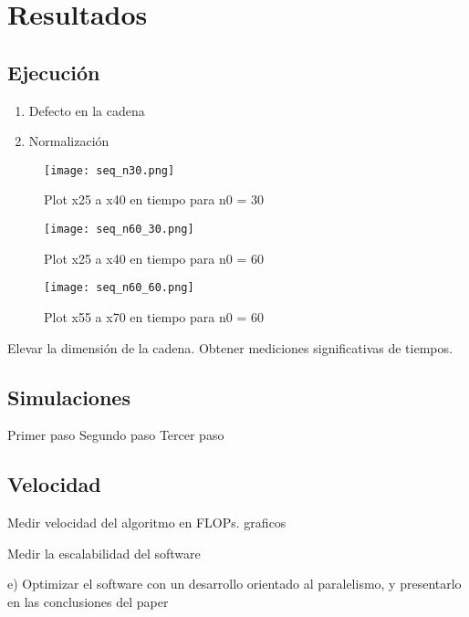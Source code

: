 \section{Resultados}

\subsection{Ejecución}

\begin{enumerate}
	\item Defecto en la cadena
	      	          
	\item Normalización
	      	          
\end{enumerate}

\begin{figure}
	\centering
	\texttt{[image: seq\_n30.png]}
	\caption{Plot x25 a x40 en tiempo para n0 = 30}
\end{figure}

\begin{figure}
	\centering
	\texttt{[image: seq\_n60\_30.png]}
	\caption{Plot x25 a x40 en tiempo para n0 = 60}
\end{figure}

\begin{figure}
	\centering
	\texttt{[image: seq\_n60\_60.png]}
	\caption{Plot x55 a x70 en tiempo para n0 = 60}
\end{figure}



Elevar la dimensión de la cadena. Obtener mediciones significativas de tiempos.

\subsection{Simulaciones}
Primer paso
Segundo paso
Tercer paso



	      	          


\subsection{Velocidad}

Medir velocidad del algoritmo en FLOPs. graficos

Medir la escalabilidad del software

e) Optimizar el software con un desarrollo orientado al paralelismo, y presentarlo
en las conclusiones del paper